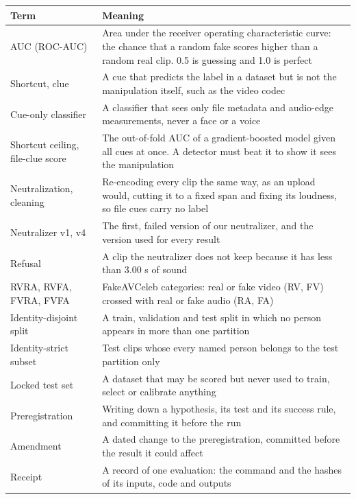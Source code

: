 \begin{longtable}{@{}>{\raggedright\arraybackslash}p{}>{\raggedright\arraybackslash}p{}@{}}
    \toprule
    \textbf{Term} & \textbf{Meaning} \\
    \midrule
    \endhead
    AUC (ROC-AUC)       & Area under the receiver operating characteristic curve: the chance that a random fake scores higher than a random real clip. 0.5 is guessing and 1.0 is perfect \\
    Shortcut, clue      & A cue that predicts the label in a dataset but is not the manipulation itself, such as the video codec \\
    Cue-only classifier & A classifier that sees only file metadata and audio-edge measurements, never a face or a voice \\
    Shortcut ceiling, file-clue score & The out-of-fold AUC of a gradient-boosted model given all cues at once. A detector must beat it to show it sees the manipulation \\
    Neutralization, cleaning & Re-encoding every clip the same way, as an upload would, cutting it to a fixed span and fixing its loudness, so file cues carry no label \\
    Neutralizer v1, v4  & The first, failed version of our neutralizer, and the version used for every result \\
    Refusal             & A clip the neutralizer does not keep because it has less than 3.00 s of sound \\
    RVRA, RVFA, FVRA, FVFA & FakeAVCeleb categories: real or fake video (RV, FV) crossed with real or fake audio (RA, FA) \\
    Identity-disjoint split & A train, validation and test split in which no person appears in more than one partition \\
    Identity-strict subset & Test clips whose every named person belongs to the test partition only \\
    Locked test set     & A dataset that may be scored but never used to train, select or calibrate anything \\
    Preregistration     & Writing down a hypothesis, its test and its success rule, and committing it before the run \\
    Amendment           & A dated change to the preregistration, committed before the result it could affect \\
    Receipt             & A record of one evaluation: the command and the hashes of its inputs, code and outputs \\

\end{longtable}
